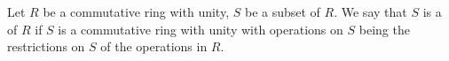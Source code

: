 \begin{definition}
  Let $R$ be a commutative ring with unity, $S$ be a subset of $R$.
  We say that $S$ is a  of $R$ if $S$ is a
  commutative ring with unity with operations on $S$ being the restrictions on
  $S$ of the operations in $R$.
\end{definition}

